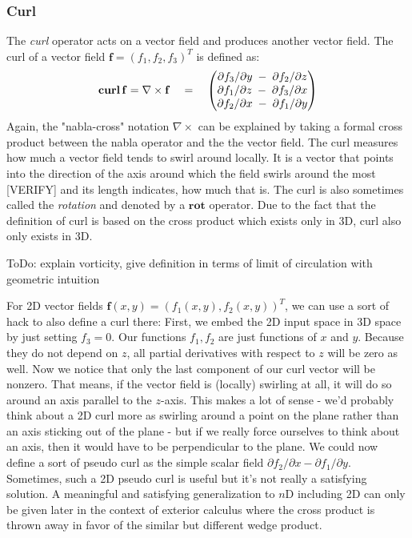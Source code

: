 \subsubsection{Curl}
The \emph{curl} operator acts on a vector field and produces another vector field. The curl of a vector field $\mathbf{f} = (f_1, f_2, f_3)^T$ is defined as:
\begin{equation}
 \operatorname{\mathbf{curl}} \mathbf{f} = \nabla \times \mathbf{f}  \quad = \quad
 \begin{pmatrix}
	\partial f_3 / \partial y \; - \; \partial f_2 / \partial z \\
	\partial f_1 / \partial z \; - \; \partial f_3 / \partial x \\
	\partial f_2 / \partial x \; - \; \partial f_1 / \partial y
\end{pmatrix} 
\end{equation}
Again, the "nabla-cross" notation  $\nabla \times$ can be explained by taking a formal cross product between the nabla operator and the the vector field. The curl measures how much a vector field tends to swirl around locally. It is a vector that points into the direction of the axis around which the field swirls around the most [VERIFY] and its length indicates, how much that is. The curl is also sometimes called the \emph{rotation} and denoted by a $\mathbf{rot}$ operator. Due to the fact that the definition of curl is based on the cross product which exists only in 3D, curl also only exists in 3D. 

ToDo: explain vorticity, give definition in terms of limit of circulation with geometric intuition





\medskip
For 2D vector fields $\mathbf{f}(x,y) = (f_1(x,y), f_2(x,y))^T$, we can use a sort of hack to also define a curl there: First, we embed the 2D input space in 3D space by just setting $f_3 = 0$. Our functions $f_1, f_2$ are just functions of $x$ and $y$.  Because they do not depend on $z$, all partial derivatives with respect to $z$ will be zero as well. Now we notice that only the last component of our curl vector will be nonzero. That means, if the vector field is (locally) swirling at all, it will do so around an axis parallel to the $z$-axis. This makes a lot of sense - we'd probably think about a 2D curl more as swirling around a point on the plane rather than an axis sticking out of the plane - but if we really force ourselves to think about an axis, then it would have to be perpendicular to the plane. We could now define a sort of pseudo curl as the simple scalar field $\partial f_2 / \partial x - \partial f_1 / \partial y$. Sometimes, such a 2D pseudo curl is useful but it's not really a satisfying solution. A meaningful and satisfying generalization to $n$D including 2D can only be given later in the context of exterior calculus where the cross product is thrown away in favor of the similar but different wedge product. 

